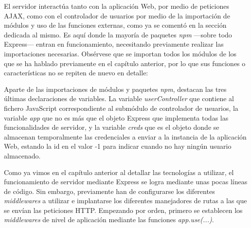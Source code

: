 El servidor interactúa tanto con la aplicación Web, por medio de peticiones AJAX, como con el controlador de usuarios por medio de la importación de módulos y uso de las funciones externas, como ya se comentó en la sección dedicada al mismo. Es aquí donde la mayoría de paquetes \emph{npm} —sobre todo Express— entran en funcionamiento, necesitando previamente realizar las importaciones necesarias. Obsérvese que se importan todos los módulos de los que se ha hablado previamente en el capítulo anterior, por lo que sus funciones o características no se repiten de nuevo en detalle:


Aparte de las importaciones de módulos y paquetes \emph{npm}, destacan las tres últimas declaraciones de variables. La variable \emph{userController} que contiene al fichero JavaScript correspondiente al submódulo de controlador de usuarios, la variable \emph{app} que no es más que el objeto Express que implementa todas las funcionalidades de servidor, y la variable \emph{creds} que es el objeto donde se almacenan temporalmente las credenciales a enviar a la instancia de la aplicación Web, estando la id en el valor -1 para indicar cuando no hay ningún usuario almacenado.

Como ya vimos en el capítulo anterior al detallar las tecnologías a utilizar, el funcionamiento de servidor mediante Express se logra mediante unas pocas líneas de código. Sin embargo, previamente han de configurarse los diferentes \emph{middlewares} a utilizar e implantarse los diferentes manejadores de rutas a las que se envían las peticiones HTTP. Empezando por orden, primero se establecen los \emph{middlewares} de nivel de aplicación mediante las funciones \emph{app.use(...)}.

